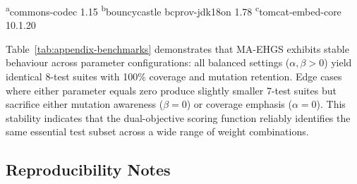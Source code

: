 \begin{appendices}
\begin{table}[H]
  \footnotesize
  \textsuperscript{a}commons-codec 1.15 \quad
  \textsuperscript{b}bouncycastle bcprov-jdk18on 1.78 \quad
  \textsuperscript{c}tomcat-embed-core 10.1.20
\end{table}

Table~\ref{tab:appendix-benchmarks} demonstrates that MA-EHGS exhibits stable behaviour across parameter configurations: all balanced settings ($\alpha, \beta > 0$) yield identical 8-test suites with 100\% coverage and mutation retention. Edge cases where either parameter equals zero produce slightly smaller 7-test suites but sacrifice either mutation awareness ($\beta=0$) or coverage emphasis ($\alpha=0$). This stability indicates that the dual-objective scoring function reliably identifies the same essential test subset across a wide range of weight combinations.

\subsection*{Reproducibility Notes}


\end{appendices}
